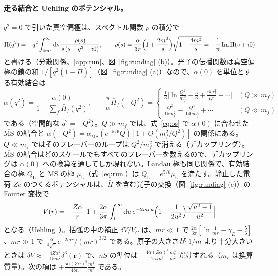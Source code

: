 \documentclass[a4paper,10pt]{ltjsarticle}
\newcommand{\dd}{\mathrm{d}}
\newcommand{\MSbar}{\overline{\mathrm{MS}}}
\begin{document}
\paragraph{走る結合と Uehling のポテンシャル。}$q^2=0$ で引いた真空偏極は、スペクトル関数 $\rho$ の積分で
\begin{equation}
\bar\Pi(q^2)=-q^2\int_{4m^2}^\infty\dd s\,\frac{\rho(s)}{s\,(s-q^2-i0)},\qquad
\rho(s)=\frac{\alpha}{3\pi}\Bigl(1+\frac{2m^2}{s}\Bigr)\sqrt{1-\frac{4m^2}{s}}=-\frac1\pi\,\mathrm{Im}\,\bar\Pi(s+i0)
\label{eq:disp}
\end{equation}
と書ける（分散関係、\ref{app:run}、図~\ref{fig:rundiag} (b)）。光子の伝播関数は真空偏極の鎖の和 $1/[q^2(1-\bar\Pi)]$（図~\ref{fig:rundiag} (a)）なので、$\alpha(0)$ を単位とする有効結合は
\begin{equation}
\alpha(q^2)=\frac{\alpha(0)}{1-\sum_f\bar\Pi_f(q^2)},\qquad
\frac\pi\alpha\bar\Pi_f(-Q^2)=\begin{cases}\frac13\bigl[\ln\frac{Q^2}{m_f^2}-\frac53+\frac{6m_f^2}{Q^2}+\cdots\bigr] & (Q\gg m_f)\\[2pt] \frac{Q^2}{15m_f^2}-\frac{Q^4}{140m_f^4}+\cdots & (Q\ll m_f)\end{cases}
\label{eq:aeff}
\end{equation}
である（空間的な $q^2=-Q^2$）。$Q\gg m_f$ では、式~\eqref{eq:os} で $\alpha(0)$ に合わせた $\MSbar$ の結合と $\alpha(-Q^2)=\alpha_{\MSbar}(e^{-5/6}Q)[1+O(m_f^2/Q^2)]$ の関係にある。$Q\ll m_f$ ではそのフレーバーのループは $Q^2/m_f^2$ で消える（デカップリング）。$\MSbar$ の結合はどのスケールでもすべてのフレーバーを数えるので、デカップリングは $\alpha(0)$ への換算を通してしか現れない。Landau 極も同じ関係で、有効結合の極 $Q_{\mathrm L}$ と $\MSbar$ の極 $\mu_{\mathrm L}$（式~\eqref{eq:run}）は $Q_{\mathrm L}=e^{5/6}\mu_{\mathrm L}$ を満たす。静止した電荷 $Ze$ のつくるポテンシャルは、$\bar\Pi$ を含む光子の交換（図~\ref{fig:rundiag} (c)）の Fourier 変換で
\begin{equation}
V(r)=-\frac{Z\alpha}{r}\Bigl[1+\frac{2\alpha}{3\pi}\int_1^\infty\dd u\,e^{-2mru}\Bigl(1+\frac{1}{2u^2}\Bigr)\frac{\sqrt{u^2-1}}{u^2}\Bigr]
\label{eq:uehling}
\end{equation}
となる（Uehling~\cite{uehling}）。括弧の中の補正 $\delta V/V_C$ は、$mr\ll1$ で $\frac{2\alpha}{3\pi}[\ln\frac{1}{mr}-\gamma_E-\frac56]$、$mr\gg1$ で $\frac{\alpha}{4\sqrt\pi}e^{-2mr}/(mr)^{3/2}$ である。原子の大きさが $1/m$ より十分大きいときは $\delta V\approx-\frac{4Z\alpha^2}{15m^2}\delta^3(\boldsymbol r)$ で、$nS$ の準位は $-\frac{4\alpha(Z\alpha)^4}{15\pi n^3}\frac{m_r^3}{m^2}$ だけずれる（$m_r$ は換算質量）。次の項は $+\frac{5\alpha(Z\alpha)^5}{48n^3}\frac{m_r^4}{m^3}$ である。
\end{document}
